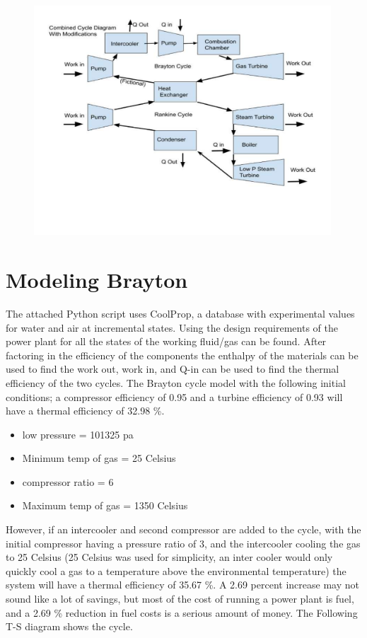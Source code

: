 \documentclass{article}
\begin{document}
\begin{figure}[!htbp]
\centering
  \includegraphics[page=1,trim=10mm 0mm 10mm 0mm,clip,width=0.99\textwidth]{Figures/Copy of Combined Cycle Diagram.pdf}
  \caption{}
  \label{fig:epsfig}
\end{figure}

\FloatBarrier

\section{Modeling Brayton}

The attached Python script uses CoolProp, a database with experimental values for water and air at incremental states. Using the design requirements of the power plant for all the states of the working fluid/gas can be found. After factoring in the efficiency of the components the enthalpy of the materials can be used to find the work out, work in, and Q-in can be used to find the thermal efficiency of the two cycles. The Brayton cycle model with the following initial conditions; a compressor efficiency of 0.95 and a turbine efficiency of 0.93 will have a thermal efficiency of 32.98 \%.
\begin{itemize}
\item  low pressure = 101325 pa
\item Minimum temp of gas = 25 Celsius
\item compressor ratio = 6
\item Maximum temp of gas = 1350 Celsius
\end{itemize}

However, if an intercooler and second compressor are added to the cycle, with the initial compressor having a pressure ratio of 3, and the intercooler cooling the gas to 25 Celsius (25 Celsius was used for simplicity, an inter cooler would only quickly cool a gas to a temperature above the environmental temperature) the system will have a thermal efficiency of 35.67 \%.  A 2.69 percent increase may not sound like a lot of savings, but most of the cost of running a power plant is fuel, and a 2.69 \% reduction in fuel costs is a serious amount of money. The Following T-S diagram shows the cycle.
\end{document}
